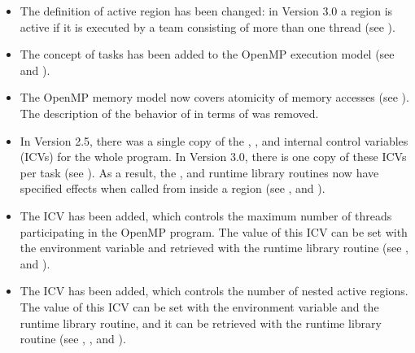 \begin{itemize}
\item The definition of active  region has been changed: in Version 3.0 a
 region is active if it is executed by a team consisting of more than one
thread (see
).

\item The concept of tasks has been added to the OpenMP execution model (see
 and
).

\item The OpenMP memory model now covers atomicity of memory accesses (see
).
The description of the behavior of  in terms of
 was removed.

\item In Version 2.5, there was a single copy of the , ,  and
 internal control variables (ICVs) for the whole program. In Version
3.0, there is one copy of these ICVs per task (see
). As a result,
the ,  and 
runtime library routines now have specified effects when called from inside a
 region (see
,
 and
).

\item The  ICV has been added, which controls the maximum number of
threads participating in the OpenMP program. The value of this ICV can be set with
the  environment variable and retrieved with the
 runtime library routine (see
,
 and
).

\item The  ICV has been added, which controls the number of nested
active  regions. The value of this ICV can be set with the
 environment variable and the
 runtime library routine, and it can be retrieved
with the  runtime library routine (see
,
,
 and
).


\end{itemize}
